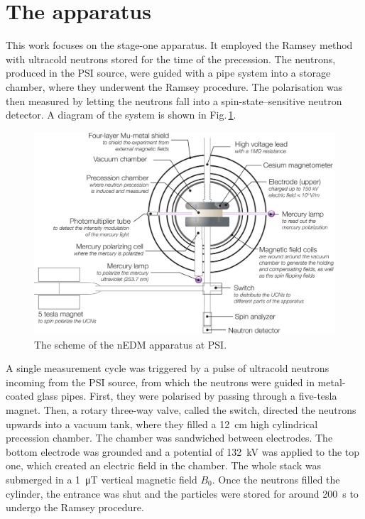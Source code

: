 \section{The apparatus}
This work focuses on the stage-one apparatus. It employed the Ramsey method with ultracold neutrons stored for the time of the precession. The neutrons, produced in the PSI source, were guided with a pipe system into a storage chamber, where they underwent the Ramsey procedure. The polarisation was then measured by letting the neutrons fall into a spin-state--sensitive neutron detector. A diagram of the system is shown in Fig.\,\ref{fig:nEDM_scheme}.

\begin{figure}
  \centering
  \includegraphics[width=\linewidth]{gfx/nEDMatPSI/apparatus-cartoon-main-and-sub-labels.pdf}
  \caption{The scheme of the nEDM apparatus at PSI\@.  }\label{fig:nEDM_scheme}
\end{figure}

A single measurement cycle was triggered by a pulse of ultracold neutrons incoming from the PSI source, from which the neutrons were guided in metal-coated glass pipes.
First, they were polarised by passing through a five-tesla magnet.
Then, a rotary three-way valve, called the switch, directed the neutrons upwards into a vacuum tank, where they filled a \SI{12}{\centi\meter} high cylindrical precession chamber.
The chamber was sandwiched between electrodes. The bottom electrode was grounded and a potential of \SI{132}{\kilo\volt} was applied to the top one, which created an electric field in the chamber.
The whole stack was submerged in a \SI{1}{\micro\tesla} vertical magnetic field $B_0$.
Once the neutrons filled the cylinder, the entrance was shut and the particles were stored for around \SI{200}{\second} to undergo the Ramsey procedure.

